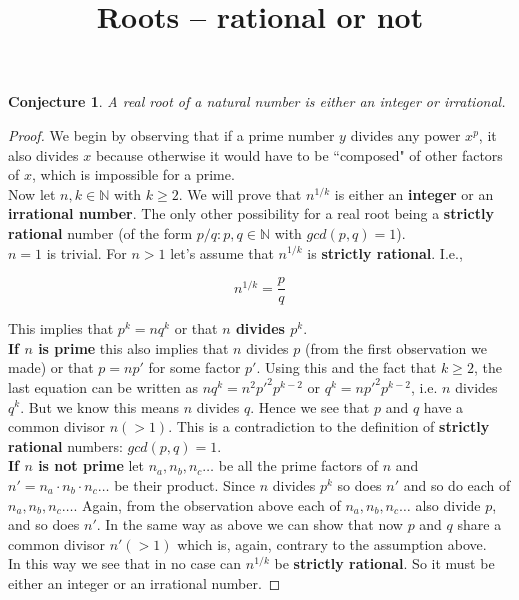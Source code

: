 \documentclass{article}
\title{Roots – rational or not}
\newtheorem*{conjecture}{Conjecture}
\newtheorem*{corollary}{Corollary}
\begin{document}
\maketitle

\begin{conjecture}A real root of a natural number is either
    an integer or irrational.
\end{conjecture}
\begin{proof}We begin by observing that if a prime number $y$ 
    divides any power $x^p$, it also divides 
    $x$ because otherwise it would have to be ``composed" of other
    factors of $x$, which is impossible for a prime.\\

    Now let $n,k\in\mathbb{N}$ with $k\ge{2}$. We will prove 
    that $n^{1/k}$ is either an \textbf{integer} 
    or an \textbf{irrational number}. The only other possibility
    for a real root being a \textbf{strictly rational} number
    (of the form $p/q: p,q\in \mathbb{N}$ with $gcd(p,q) = 1$).\\

    $n=1$ is trivial. For $n>1$ let's assume that 
    $n^{1/k}$ is \textbf{strictly rational}. I.e.,
    
    $$n^{1/k} = \frac{p}{q}$$

    This implies that $p^k = nq^k$ or that 
    \textbf{$n$ divides $p^k$}.\\

    \textbf{If $n$ is prime}
    this also implies that $n$ divides $p$ (from the first observation we made)
    or that $p=np'$ for some factor $p'$.
    Using this and the fact that $k\ge{2}$, the last
    equation can be written as $nq^k = n^2{p'}^2 p^{k-2}$
    or $q^k = n{p'}^2 p^{k-2}$, i.e. $n$ divides $q^k$. 
    But we know this means $n$ divides $q$. Hence we see that
    $p$ and $q$ have a common divisor $n(>1)$. This is a contradiction
    to the definition of \textbf{strictly rational} numbers:
    $gcd(p,q)=1$.\\

    \textbf{If $n$ is not prime}
    let $n_a,n_b,n_c\dots$ be all the prime factors of $n$
    and $n' = n_a \cdot n_b \cdot n_c\dots$ be their product.
    Since $n$ divides $p^k$ so does $n'$ and so do each of $n_a,n_b,n_c\dots$.
    Again, from the observation above each of $n_a,n_b,n_c\dots$
    also divide $p$, and so does $n'$. In the same way as above
    we can show that now $p$ and $q$ share a common divisor
    $n'(>1)$ which is, again, contrary to the assumption above.\\

    In this way we see that in no case can $n^{1/k}$ be
    \textbf{strictly rational}. 
    So it must be either an integer or an irrational number.
\end{proof}
    
% 
    
\end{document}
